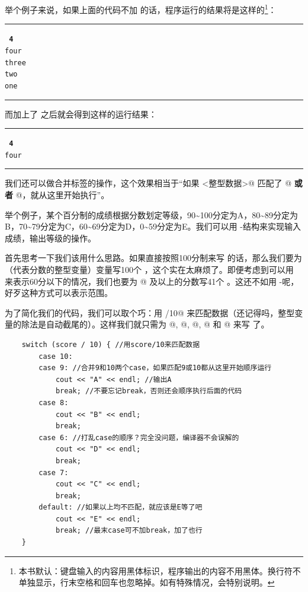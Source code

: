 举个例子来说，如果上面的代码不加 \lstinline@break@ 的话，程序运行的结果将是这样的\footnote{本书默认：键盘输入的内容用黑体标识，程序输出的内容不用黑体。换行符不单独显示，行末空格和回车也忽略掉。如有特殊情况，会特别说明。}：\\\noindent\rule{\linewidth}{0.2pt}\texttt{
\textbf{4}\\
four\\
three\\
two\\
one
}\\\noindent\rule{\linewidth}{0.2pt}
而加上了 \lstinline@break@ 之后就会得到这样的运行结果：\\\noindent\rule{\linewidth}{0.2pt}\texttt{
\textbf{4}\\
four
}\\\noindent\rule{\linewidth}{0.2pt}\par
我们还可以做合并标签的操作，这个效果相当于``如果 \lstinline@<整型数据>@ 匹配了 @ \textbf{或者} @，就从这里开始执行''。\par
举个例子，某个百分制的成绩根据分数划定等级，90\~{}100分定为A，80\~{}89分定为B，70\~{}79分定为C，60\~{}69分定为D，0\~{}59分定为E。我们可以用 \lstinline@switch@-\lstinline@case@ 结构来实现输入成绩，输出等级的操作。\par
首先思考一下我们该用什么思路。如果直接按照100分制来写 \lstinline@case@ 的话，那么我们要为 \lstinline@score@ （代表分数的整型变量）变量写100个 \lstinline@case@，这个实在太麻烦了。即便考虑到可以用 \lstinline@default@ 来表示60分以下的情况，我们也要为 @ 及以上的分数写41个 \lstinline@case@。这还不如用 \lstinline@if@-\lstinline@else@ 呢，好歹这种方式可以表示范围。\par
为了简化我们的代码，我们可以取个巧：用 \lstinline@score/10@ 来匹配数据（还记得吗，整型变量的除法是自动截尾的）。这样我们就只需为 @, @, @, @ 和 @ 来写 \lstinline@case@ 了。\par
\begin{lstlisting}
    switch (score / 10) { //用score/10来匹配数据
        case 10:
        case 9: //合并9和10两个case，如果匹配9或10都从这里开始顺序运行
            cout << "A" << endl; //输出A
            break; //不要忘记break，否则还会顺序执行后面的代码
        case 8:
            cout << "B" << endl;
            break;
        case 6: //打乱case的顺序？完全没问题，编译器不会误解的
            cout << "D" << endl;
            break;
        case 7:
            cout << "C" << endl;
            break;
        default: //如果以上均不匹配，就应该是E等了吧
            cout << "E" << endl;
            break; //最末case可不加break，加了也行
    }
\end{lstlisting}
